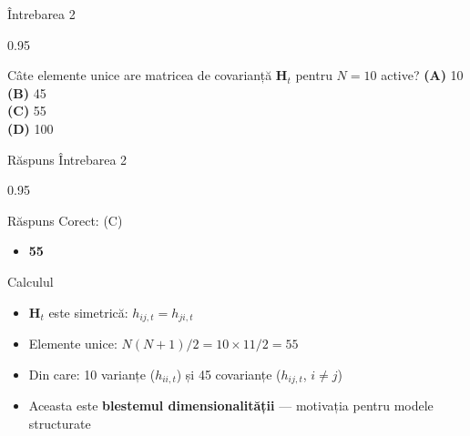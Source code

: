\documentclass[9pt, aspectratio=169, t]{beamer}
\begin{document}
\begin{frame}{Întrebarea 2}
    \begin{cminipage}{0.95\textwidth}
    \begin{block}{Câte elemente unice are matricea de covarianță $\mathbf{H}_t$ pentru $N = 10$ active?}
        \textcolor{MainBlue}{\textbf{(A)}} 10\\[3pt]
        \textcolor{MainBlue}{\textbf{(B)}} 45\\[3pt]
        \textcolor{MainBlue}{\textbf{(C)}} 55\\[3pt]
        \textcolor{MainBlue}{\textbf{(D)}} 100
    \end{block}
    \end{cminipage}
\end{frame}

\begin{frame}{Răspuns Întrebarea 2}
    \begin{cminipage}{0.95\textwidth}
    \begin{exampleblock}{Răspuns Corect: (C)}
        \begin{itemize}\setlength{\itemsep}{0pt}
            \item \textbf{55}
        \end{itemize}
    \end{exampleblock}

    \pause
    \begin{block}{Calculul}
        \begin{itemize}\setlength{\itemsep}{0pt}
            \item $\mathbf{H}_t$ este simetrică: $h_{ij,t} = h_{ji,t}$
            \item Elemente unice: $N(N+1)/2 = 10 \times 11/2 = 55$
            \item Din care: 10 varianțe ($h_{ii,t}$) și 45 covarianțe ($h_{ij,t}$, $i \neq j$)
            \item Aceasta este \textbf{blestemul dimensionalității} --- motivația pentru modele structurate
        \end{itemize}
    \end{block}
    \end{cminipage}
\end{frame}
\end{document}
